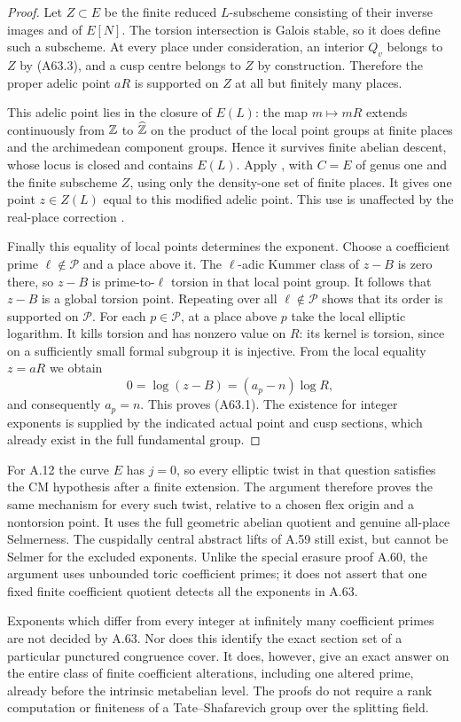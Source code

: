 \begin{proof}
Let $Z\subset E$ be the finite reduced $L$-subscheme consisting
of their inverse images and of $E[N]$. The torsion intersection
is Galois stable, so it does define such a subscheme.
At every place under consideration, an interior $Q_v$ belongs
to $Z$ by (A63.3), and a cusp centre belongs to $Z$ by
construction. Therefore the proper adelic point $aR$ is
supported on $Z$ at all but finitely many places.

This adelic point lies in the closure of $E(L)$: the map
$m\mapsto mR$ extends continuously from $\mathbb Z$ to
$\widehat{\mathbb Z}$ on the product of the local point groups at finite places
and the archimedean component groups. Hence it survives finite
abelian descent, whose locus is closed and contains $E(L)$.
Apply \citet[Theorem~8.2]{AMStoll2007}, with $C=E$ of genus one
and the finite subscheme $Z$, using only the density-one set
of finite places. It gives one point $z\in Z(L)$ equal to this
modified adelic point. This use is unaffected by the real-place
correction \citep{AMStollErrata2017}.

Finally this equality of local points determines the exponent.
Choose a coefficient prime $\ell\notin\mathcal P$ and a place
above it. The $\ell$-adic Kummer class of $z-B$ is zero there,
so $z-B$ is prime-to-$\ell$ torsion in that local point group.
It follows that $z-B$ is a global torsion point. Repeating over
all $\ell\notin\mathcal P$ shows that its order is supported
on $\mathcal P$. For each $p\in\mathcal P$, at a place above
$p$ take the local elliptic logarithm. It kills torsion and has
nonzero value on $R$: its kernel is torsion, since on a
sufficiently small formal subgroup it is injective. From the
local equality $z=aR$ we obtain
\[
 0=\log(z-B)=(a_p-n)\log R,
\]
and consequently $a_p=n$. This proves (A63.1).
The existence for integer exponents is supplied by the indicated
actual point and cusp sections, which already exist in the full
fundamental group.
\end{proof}

For A.12 the curve $E$ has $j=0$, so every elliptic twist in
that question satisfies the CM hypothesis after a finite
extension. The argument therefore proves the same mechanism
for every such twist, relative to a chosen flex origin and a
nontorsion point. It uses the full geometric abelian quotient
and genuine all-place Selmerness. The cuspidally central
abstract lifts of A.59 still exist, but cannot be Selmer for
the excluded exponents. Unlike the special erasure proof
A.60, the argument uses unbounded toric coefficient primes;
it does not assert that one fixed finite coefficient quotient
detects all the exponents in A.63.

Exponents which differ from every integer at infinitely many
coefficient primes are not decided by A.63. Nor does this
identify the exact section set of a particular punctured
congruence cover. It does, however, give an exact answer on
the entire class of finite coefficient alterations, including
one altered prime, already before the intrinsic
metabelian level. The proofs do not require a rank computation
or finiteness of a Tate--Shafarevich group over the splitting field.

